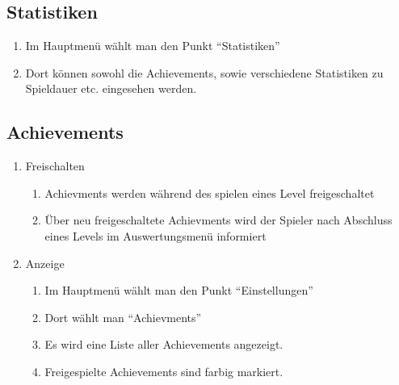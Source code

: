 \documentclass{scrartcl}
\begin{document}
\subsection{Statistiken} \label{szenarien:statistik}
	\begin{enumerate}
		\item Im Hauptmenü wählt man den Punkt \enquote{Statistiken}
		\item Dort können sowohl die Achievements, sowie verschiedene Statistiken zu Spieldauer etc. eingesehen werden.
	\end{enumerate}

\subsection{Achievements} \label{szenarien:achievements}
 \begin{enumerate}
 	\item Freischalten
 		\begin{enumerate}
 			\item Achievments werden während des spielen eines Level freigeschaltet
 			\item Über neu freigeschaltete Achievments wird der Spieler nach Abschluss eines Levels im Auswertungsmenü informiert
 		\end{enumerate}
 	\item Anzeige
 	 	\begin{enumerate}
 	 		\item Im Hauptmenü wählt man den Punkt \enquote{Einstellungen}
 	 		\item Dort wählt man \enquote{Achievments}
 	 		\item Es wird eine Liste aller Achievements angezeigt.
 	 		\item Freigespielte Achievements sind farbig markiert. 
 		\end{enumerate}
 \end{enumerate}
\end{document}
